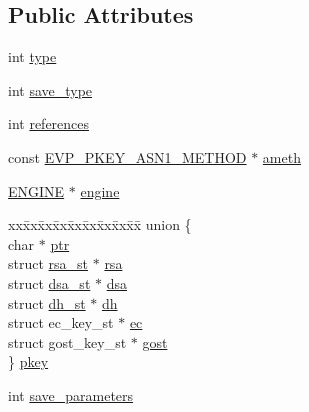 \subsection*{Public Attributes}
\begin{DoxyCompactItemize}
\item 
int \hyperlink{structevp__pkey__st_a7d550d554ff45db26681e2d2e2f23b66}{type}
\item 
int \hyperlink{structevp__pkey__st_a0bbebdbdbba1e1f9c796c1e4a3a2eb04}{save\+\_\+type}
\item 
int \hyperlink{structevp__pkey__st_a89b11b788ffad7d747d1c7eed4cf279f}{references}
\item 
const \hyperlink{ossl__typ_8h_ad6f9ae1a91c11cdab63573650a801802}{E\+V\+P\+\_\+\+P\+K\+E\+Y\+\_\+\+A\+S\+N1\+\_\+\+M\+E\+T\+H\+OD} $\ast$ \hyperlink{structevp__pkey__st_a89d9cab6071d889719126a8ebc03b673}{ameth}
\item 
\hyperlink{ossl__typ_8h_abac45b251498719318e60ab8d6192510}{E\+N\+G\+I\+NE} $\ast$ \hyperlink{structevp__pkey__st_a1fa3baf8af4a6f09233be9db77623e30}{engine}
\item 
\begin{tabbing}
xx\=xx\=xx\=xx\=xx\=xx\=xx\=xx\=xx\=\kill
union \{\\
\>char $\ast$ \hyperlink{structevp__pkey__st_a81bea212d8e9bf124dab776b6d64942e}{ptr}\\
\>struct \hyperlink{structrsa__st}{rsa\_st} $\ast$ \hyperlink{structevp__pkey__st_ab8556e096e26024e17c0663088415dbe}{rsa}\\
\>struct \hyperlink{structdsa__st}{dsa\_st} $\ast$ \hyperlink{structevp__pkey__st_a6fc42b6128c7ee00a38a09e79855ac0d}{dsa}\\
\>struct \hyperlink{structdh__st}{dh\_st} $\ast$ \hyperlink{structevp__pkey__st_a8223fcbd092d46636b215d7fb782bbf5}{dh}\\
\>struct ec\_key\_st $\ast$ \hyperlink{structevp__pkey__st_a91f022c5aa3812a5d62884f04049407f}{ec}\\
\>struct gost\_key\_st $\ast$ \hyperlink{structevp__pkey__st_a4fe906e486a696277b5b5979417f3081}{gost}\\
\} \hyperlink{structevp__pkey__st_a785aaf147af8d4fa0ebdc3c7267cb772}{pkey}\\

\end{tabbing}\item 
int \hyperlink{structevp__pkey__st_a5ce6533b78cc5e5814a60ca2403c3108}{save\+\_\+parameters}
\end{DoxyCompactItemize}


